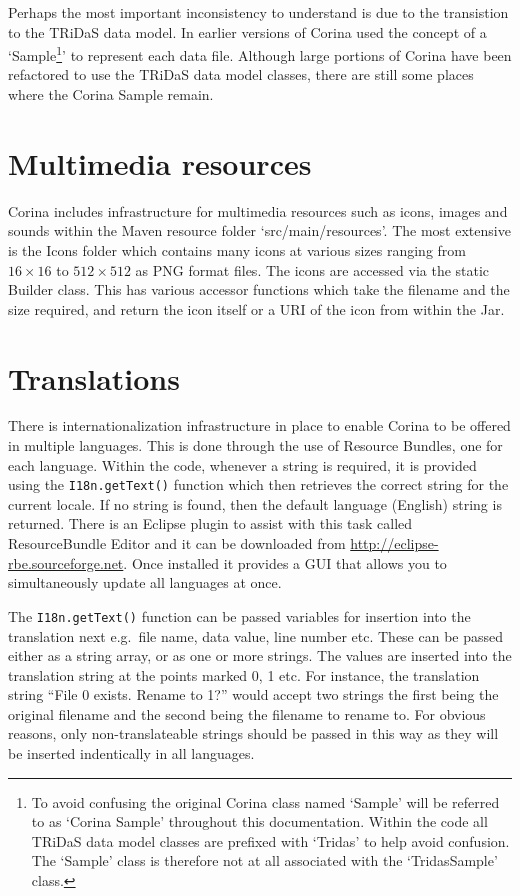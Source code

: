 Perhaps the most important inconsistency to understand is due to the transistion to the TRiDaS data model.  In earlier versions of Corina used the concept of a `Sample\footnote{To avoid confusing the original Corina class named `Sample' will be referred to as `Corina Sample' throughout this documentation.  Within the code all TRiDaS data model classes are prefixed with `Tridas' to help avoid confusion.  The `Sample' class is therefore not at all associated with the `TridasSample' class.}' to represent each data file.  Although large portions of Corina have been refactored to use the TRiDaS data model classes, there are still some places where the Corina Sample remain.  

\section{Multimedia resources}
Corina includes infrastructure for multimedia resources such as icons, images and sounds within the Maven resource folder `src/main/resources'.  The most extensive is the Icons folder which contains many icons at various sizes ranging from $16\times16$ to $512\times512$ as PNG format files.  The icons are accessed via the static Builder class.  This has various accessor functions which take the filename and the size required, and return the icon itself or a URI of the icon from within the Jar.

\section{Translations}
There is internationalization infrastructure in place to enable Corina to be offered in multiple languages.  This is done through the use of Resource Bundles, one for each language.  Within the code, whenever a string is required, it is provided using the \verb|I18n.getText()| function which then retrieves the correct string for the current locale.  If no string is found, then the default language (English) string is returned.  There is an Eclipse plugin to assist with this task called ResourceBundle Editor and it can be downloaded from \url{http://eclipse-rbe.sourceforge.net}.  Once installed it provides a GUI that allows you to simultaneously update all languages at once.

The \verb|I18n.getText()| function can be passed variables for insertion into the translation next e.g.\ file name, data value, line number etc.  These can be passed either as a string array, or as one or more strings.  The values are inserted into the translation string at the points marked {0}, {1} etc.  For instance, the translation string ``File {0} exists.  Rename to {1}?'' would accept two strings the first being the original filename and the second being the filename to rename to.  For obvious reasons, only non-translateable strings should be passed in this way as they will be inserted indentically in all languages.


